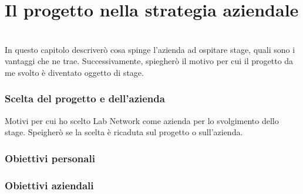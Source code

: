 
\chapter{Il progetto nella strategia aziendale}
\label{cap:processi-metodologie}

\\

In questo capitolo descriverò cosa spinge l'azienda ad ospitare stage, quali sono i vantaggi che ne trae.
Successivamente, spiegherò il motivo per cui il progetto da me svolto è diventato oggetto di stage.
\subsection{Scelta del progetto e dell'azienda}
Motivi per cui ho scelto Lab Network come azienda per lo svolgimento dello stage.
Speigherò se la scelta è ricaduta sul progetto o sull'azienda.

\subsection{Obiettivi personali}


\subsection{Obiettivi aziendali}